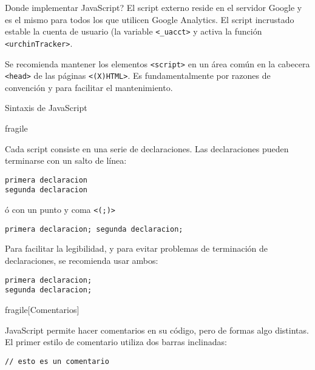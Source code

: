 \begin{frame}{Donde implementar JavaScript?}
    El script externo reside en el servidor Google y es el mismo para todos los
    que utilicen Google Analytics. El script incrustado estable la cuenta de
    usuario (la variable \texttt{<_uacct>} y activa la función
    \texttt{<urchinTracker>}.

    Se recomienda mantener los elementos \texttt{<script>} en un área común en
    la cabecera \texttt{<head>} de las páginas \texttt{<(X)HTML>}. Es
    fundamentalmente por razones de convención y para facilitar el
    mantenimiento.

\end{frame}

\begin{frame}{Sintaxis de JavaScript} %


\begin{frame}{fragile}
    
    Cada script consiste en una serie de declaraciones. Las declaraciones
    pueden terminarse con un salto de línea:

    \begin{lstlisting}
primera declaracion
segunda declaracion
    \end{lstlisting}

    ó con un punto y coma \texttt{<(;)>}

    \begin{lstlisting}
primera declaracion; segunda declaracion;
    \end{lstlisting}

    Para facilitar la legibilidad, y para evitar problemas de terminación de
    declaraciones, se recomienda usar ambos:

    \begin{lstlisting}
primera declaracion;
segunda declaracion;
    \end{lstlisting}

\end{frame}

\begin{frame}{fragile}[Comentarios] %

    JavaScript permite hacer comentarios en su código, pero de formas algo
    distintas. El primer estilo de comentario utiliza dos barras inclinadas:

    \begin{lstlisting}
// esto es un comentario
    \end{lstlisting}


\end{frame}
\end{frame}
